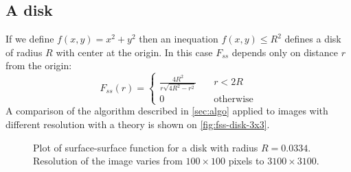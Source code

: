 \documentclass[reprint,amsmath,amssymb,aps,pre,showkeys,showpacs]{revtex4-1}
\begin{document}
\subsection{A disk}
If we define $f(x, y) = x^2 + y^2$ then an inequation $f(x, y) \le R^2$ defines
a disk of radius $R$ with center at the origin. In this case $F_{ss}$ depends
only on distance $r$ from the origin:
\begin{equation*}
  F_{ss}(r) = \left\{
  \begin{array}{ll}
    \frac{4R^2}{r\sqrt{4R^2-r^2}} & \quad r < 2R \\
    0 & \quad \text{otherwise}
  \end{array}
  \right.
\end{equation*}
A comparison of the algorithm described in \cref{sec:algo} applied to images
with different resolution with a theory is shown on \cref{fig:fss-disk-3x3}.
\begin{figure}[!pt]
  \centering
  \hfill
  \caption[]{Plot of surface-surface function for a disk with radius
    $R = 0.0334$. Resolution of the image varies from $100\times 100$ pixels to
    $3100\times 3100$.}
  \label{fig:fss-disk}
\end{figure}
\end{document}
